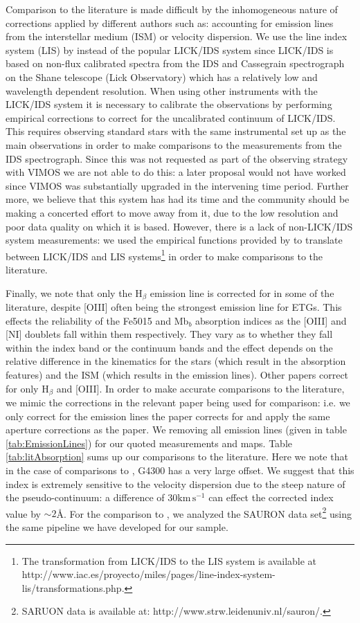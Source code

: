 {{	Comparison to the literature is made difficult by the inhomogeneous nature of corrections applied by different authors such as: accounting for emission lines from the interstellar medium (ISM) or velocity dispersion. We use the line index system (LIS) by \citet{Vazdekis2010} instead of the popular LICK/IDS system \citep{Faber1985, Worthey1994} since LICK/IDS is based on non-flux calibrated spectra from the IDS and Cassegrain spectrograph on the Shane telescope (Lick Observatory) which has a relatively low and wavelength dependent resolution. When using other instruments with the LICK/IDS system it is necessary to calibrate the observations by performing empirical corrections to correct for the uncalibrated continuum of LICK/IDS. This requires observing standard stars with the same instrumental set up as the main observations in order to make comparisons to the measurements from the IDS spectrograph. Since this was not requested as part of the observing strategy with VIMOS we are not able to do this: a later proposal would not have worked since VIMOS was substantially upgraded in the intervening time period. Further more, we believe that this system has had its time and the community should be making a concerted effort to move away from it, due to the low resolution and poor data quality on which it is based. However, there is a lack of non-LICK/IDS system measurements: we used the empirical functions provided by \citet{Vazdekis2010} to translate between LICK/IDS and LIS systems\footnote{The transformation from LICK/IDS to the LIS system is available at http://www.iac.es/proyecto/miles/pages/line-index-system-lis/transformations.php.} in order to make comparisons to the literature. 


	Finally, we note that only the H$_\beta$ emission line is corrected for in some of the literature, despite [OIII] often being the strongest emission line for ETGs. This effects the reliability of the Fe5015 and Mb$_b$ absorption indices as the [OIII] and [NI] doublets fall within them respectively. They vary as to whether they fall within the index band or the continuum bands and the effect depends on the relative difference in the kinematics for the stars (which result in the absorption features) and the ISM (which results in the emission lines). Other papers correct for only H$_\beta$ and [OIII]. In order to make accurate comparisons to the literature, we mimic the corrections in the relevant paper being used for comparison: i.e. we only correct for the emission lines the paper corrects for and apply the same aperture corrections as the paper. We removing all emission lines (given in table \ref{tab:EmissionLines}) for our quoted measurements and maps. Table \ref{tab:litAbsorption} sums up our comparisons to the literature. Here we note that in the case of comparisons to \citet{Rampazzo2005}, G4300 has a very large offset. We suggest that this index is extremely sensitive to the velocity dispersion due to the steep nature of the pseudo-continuum: a difference of $30 \mathrm{km \, s^{-1}}$ can effect the corrected index value by $\sim 2$\AA. For the comparison to \citet{Vazdekis2010}, we analyzed the SAURON data set\footnote{SARUON data is available at: http://www.strw.leidenuniv.nl/sauron/.} \citep{Emsellem2004} using the same pipeline we have developed for our sample. 

}}
